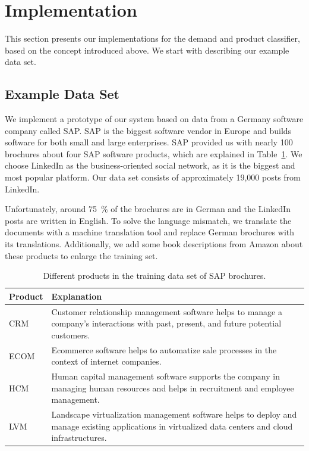 
\section{Implementation}
\label{sec:implementation}

This section presents our implementations for the demand and product classifier, based on the concept introduced above.
We start with describing our example data set.

\subsection{Example Data Set}
\label{sub:initial_data_set}
We implement a prototype of our \nto system based on data from a Germany software company called SAP\@.
SAP is the biggest software vendor in Europe and builds software for both small and large enterprises.
SAP provided us with nearly 100 brochures about four SAP software products, which are explained in Table~\ref{table:products}.
We choose LinkedIn as the business-oriented social network, as it is the biggest and most popular platform.
Our data set consists of approximately 19,000 posts from LinkedIn.

Unfortunately, around 75~\% of the brochures are in German and the LinkedIn posts are written in English.
To solve the language mismatch, we translate the documents with a machine translation tool and replace German brochures with its translations.
Additionally, we add some book descriptions from Amazon about these products to enlarge the training set.

\begin{table}[h]
	\centering
	{
		\renewcommand\arraystretch{1.25}
		\begin{tabular}{lll}
			\hline
			\textbf{Product} & \multicolumn{2}{l}{\textbf{Explanation}} \\
			\hline\hline
			CRM  & \multicolumn{2}{p{10cm}}{\raggedright
				Customer relationship management software helps to manage a company's interactions with past, present, and future potential customers.} \\
			\hline
			ECOM  & \multicolumn{2}{p{10cm}}{\raggedright
				Ecommerce software helps to automatize sale processes in the context of internet companies.} \\
			\hline
			HCM  & \multicolumn{2}{p{10cm}}{\raggedright
				Human capital management software supports the company in managing human resources and helps in recruitment and employee management.} \\
			\hline
			LVM  & \multicolumn{2}{p{10cm}}{\raggedright
				Landscape virtualization management software helps to deploy and manage existing applications in virtualized data centers and cloud infrastructures.} \\
			\hline
		\end{tabular}
	}
	\caption{Different products in the training data set of SAP brochures.}
	\label{table:products}
\end{table}


